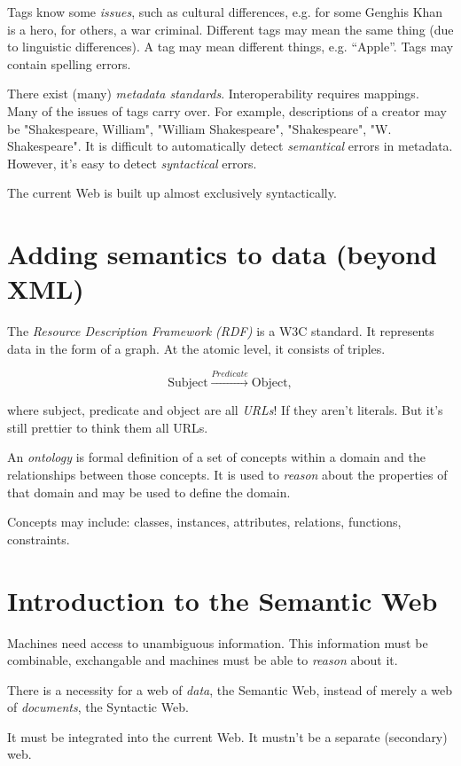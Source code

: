 \documentclass{report}
\begin{document}
Tags know some \textit{issues}, such as cultural differences,
e.g. for some Genghis Khan is a hero, for others, a war criminal.
Different tags may mean the same thing
(due to linguistic differences).
A tag may mean different things, e.g. ``Apple''.
Tags may contain spelling errors.

There exist (many) \textit{metadata standards}.
Interoperability requires mappings.
Many of the issues of tags carry over.
For example, descriptions of a creator may be
"Shakespeare, William", "William Shakespeare",
"Shakespeare", "W. Shakespeare".
It is difficult to automatically detect
\emph{semantical} errors in metadata.
However, it's easy to detect \emph{syntactical} errors.

The current Web is built up
almost exclusively syntactically.

\section{Adding semantics to data (beyond XML)}

The \textit{Resource Description Framework (RDF)} is a W3C standard.
It represents data in the form of a graph.
At the atomic level, it consists of triples.

$$\text{Subject} \xrightarrow{Predicate} \text{Object},$$

where subject, predicate and object are all \emph{URLs}!
If they aren't literals.
But it's still prettier to think them all URLs.

An \textit{ontology} is formal definition
of a set of concepts within a domain
and the relationships between those concepts.
It is used to \emph{reason}
about the properties of that domain
and may be used to define the domain.

Concepts may include:
classes, instances, attributes,
relations, functions, constraints.

\section{Introduction to the Semantic Web}

Machines need access to unambiguous information.
This information must be combinable, exchangable
and machines must be able to \emph{reason} about it.

There is a necessity for a web of \emph{data},
the Semantic Web,
instead of merely a web of \emph{documents},
the Syntactic Web.

It must be integrated into the current Web.
It mustn't be a separate (secondary) web.
\end{document}
